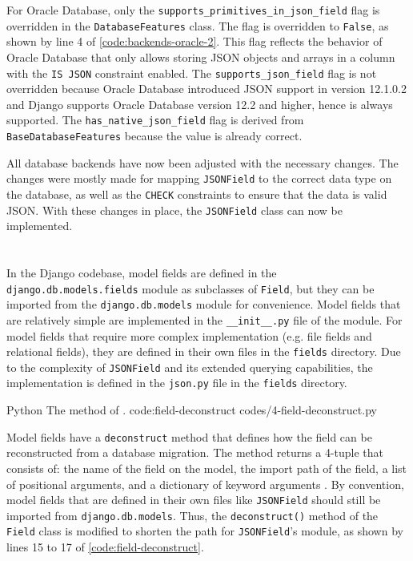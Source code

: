For Oracle Database, only the \verb|supports_primitives_in_json_field| flag is
overridden in the \verb|DatabaseFeatures| class. The flag is overridden to
\verb|False|, as shown by line 4 of \autoref{code:backends-oracle-2}. This flag
reflects the behavior of Oracle Database that only allows storing JSON objects
and arrays in a column with the \verb|IS JSON| constraint enabled. The
\verb|supports_json_field| flag is not overridden because Oracle Database
introduced JSON support in version 12.1.0.2 and Django supports Oracle Database
version 12.2 and higher, hence  is always supported. The
\verb|has_native_json_field| flag is derived from \verb|BaseDatabaseFeatures|
because the value is already correct.

All database backends have now been adjusted with the necessary changes. The
changes were mostly made for mapping \verb|JSONField| to the correct data type
on the database, as well as the \verb|CHECK| constraints to ensure that the
data is valid JSON. With these changes in place, the \verb|JSONField| class can
now be implemented.

\section{}

In the Django codebase, model fields are defined in the
\verb|django.db.models.fields| module as subclasses of \verb|Field|, but they
can be imported from the \verb|django.db.models| module for convenience. Model
fields that are relatively simple are implemented in the \verb|__init__.py|
file of the module. For model fields that require more complex implementation
(e.g. file fields and relational fields), they are defined in their own files
in the \verb|fields| directory. Due to the complexity of \verb|JSONField| and
its extended querying capabilities, the implementation is defined in the
\verb|json.py| file in the \verb|fields| directory.

\listing
{Python}
{The  method of .}
{code:field-deconstruct}
{codes/4-field-deconstruct.py}

Model fields have a \verb|deconstruct| method that defines how the field can be
reconstructed from a database migration. The method returns a 4-tuple that
consists of: the name of the field on the model, the import path of the field,
a list of positional arguments, and a dictionary of keyword arguments
\cite{django:model_fields}. By convention, model fields that are defined in
their own files like \verb|JSONField| should still be imported from
\verb|django.db.models|. Thus, the \verb|deconstruct()| method of the
\verb|Field| class is modified to shorten the path for \verb|JSONField|'s
module, as shown by lines 15 to 17 of \autoref{code:field-deconstruct}.

